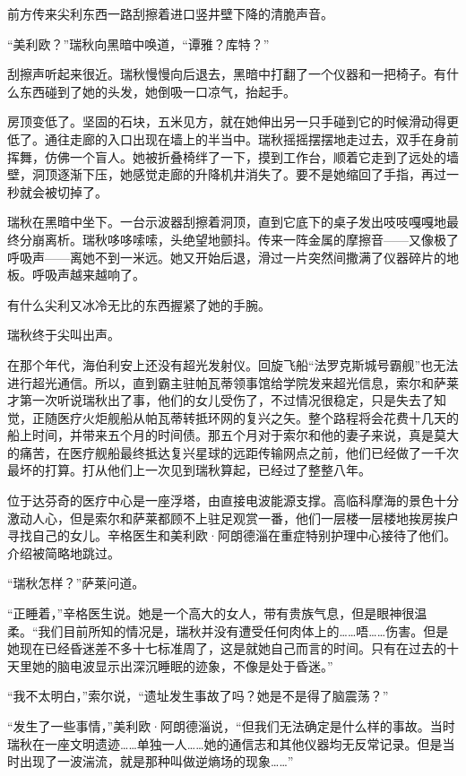 \documentclass[AutoFakeBold=true]{book}
\begin{document}
前方传来尖利东西一路刮擦着进口竖井壁下降的清脆声音。

``美利欧？''瑞秋向黑暗中唤道，``谭雅？库特？''

刮擦声听起来很近。瑞秋慢慢向后退去，黑暗中打翻了一个仪器和一把椅子。有什么东西碰到了她的头发，她倒吸一口凉气，抬起手。

房顶变低了。坚固的石块，五米见方，就在她伸出另一只手碰到它的时候滑动得更低了。通往走廊的入口出现在墙上的半当中。瑞秋摇摇摆摆地走过去，双手在身前挥舞，仿佛一个盲人。她被折叠椅绊了一下，摸到工作台，顺着它走到了远处的墙壁，洞顶逐渐下压，她感觉走廊的升降机井消失了。要不是她缩回了手指，再过一秒就会被切掉了。

瑞秋在黑暗中坐下。一台示波器刮擦着洞顶，直到它底下的桌子发出吱吱嘎嘎地最终分崩离析。瑞秋哆哆嗦嗦，头绝望地颤抖。传来一阵金属的摩擦音——又像极了呼吸声——离她不到一米远。她又开始后退，滑过一片突然间撒满了仪器碎片的地板。呼吸声越来越响了。

有什么尖利又冰冷无比的东西握紧了她的手腕。

瑞秋终于尖叫出声。

\vspace*{1em}

在那个年代，海伯利安上还没有超光发射仪。回旋飞船``法罗克斯城号霸舰''也无法进行超光通信。所以，直到霸主驻帕瓦蒂领事馆给学院发来超光信息，索尔和萨莱才第一次听说瑞秋出了事，他们的女儿受伤了，不过情况很稳定，只是失去了知觉，正随医疗火炬舰船从帕瓦蒂转抵环网的复兴之矢。整个路程将会花费十几天的船上时间，并带来五个月的时间债。那五个月对于索尔和他的妻子来说，真是莫大的痛苦，在医疗舰船最终抵达复兴星球的远距传输网点之前，他们已经做了一千次最坏的打算。打从他们上一次见到瑞秋算起，已经过了整整八年。

位于达芬奇的医疗中心是一座浮塔，由直接电波能源支撑。高临科摩海的景色十分激动人心，但是索尔和萨莱都顾不上驻足观赏一番，他们一层楼一层楼地挨房挨户寻找自己的女儿。辛格医生和美利欧·阿朗德淄在重症特别护理中心接待了他们。介绍被简略地跳过。

``瑞秋怎样？''萨莱问道。

``正睡着，''辛格医生说。她是一个高大的女人，带有贵族气息，但是眼神很温柔。``我们目前所知的情况是，瑞秋并没有遭受任何肉体上的……唔……伤害。但是她现在已经昏迷差不多十七标准周了，这是就她自己而言的时间。只有在过去的十天里她的脑电波显示出深沉睡眠的迹象，不像是处于昏迷。''

``我不太明白，''索尔说，``遗址发生事故了吗？她是不是得了脑震荡？''

``发生了一些事情，''美利欧·阿朗德淄说，``但我们无法确定是什么样的事故。当时瑞秋在一座文明遗迹……单独一人……她的通信志和其他仪器均无反常记录。但是当时出现了一波湍流，就是那种叫做逆熵场的现象……''
\end{document}
